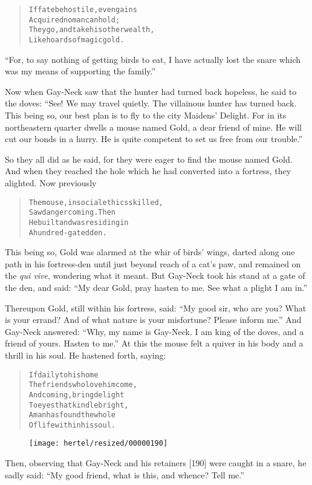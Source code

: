\documentclass[article, twoside, 10pt]{memoir}
\renewenvironment{verbatim}{%
\begin{quote}%
\vskip -10pt%
\begin{alltt}\normalfont\small}{\end{alltt}%
\end{quote}%
\vskip -10pt
} %
\begin{document}
\begin{verbatim}
If fate be hostile, even gains
Acquired no man can hold;
They go, and take his other wealth,
Like hoards of magic gold.
\end{verbatim}
``For, to say nothing of getting birds to eat, I have actually lost the snare which was my means of supporting the family.''

Now when Gay-Neck saw that the hunter had turned back hopeless, he
said to the doves:
``See! We may travel quietly. The villainous hunter has turned back. This being so, our best plan is to fly to the city Maidens' Delight. For in its northeastern quarter dwells a mouse named Gold, a dear friend of mine. He will cut our bonds in a hurry. He is quite competent to set us free from our trouble.''

So they all did as he said, for they were eager to find the mouse
named Gold. And when they reached the hole which he had converted
into a fortress, they alighted. Now previously

\begin{verbatim}
The mouse, in social ethics skilled,
    Saw danger coming. Then
He built and was residing in
    A hundred-gated den.
\end{verbatim}
This being so, Gold was alarmed at the whir of birds' wings, darted
along one path in his fortress-den until just beyond reach of a
cat's paw, and remained on the \emph{qui vive}, wondering what it
meant. But Gay-Neck took his stand at a gate of the den, and said:
``My dear Gold, pray hasten to me. See what a plight I am in.''

Thereupon Gold, still within his fortress, said:
``My good sir, who are you? What is your errand? And of what nature is your misfortune? Please inform me.''
And Gay-Neck answered:
``Why, my name is Gay-Neck. I am king of the doves, and a friend of yours. Hasten to me.''
At this the mouse felt a quiver in his body and a thrill in his
soul. He hastened forth, saying:

\begin{verbatim}
If daily to his home
The friends who love him come,
And coming, bring delight
To eyes that kindle bright,
A man has found the whole
Of life within his soul.
\end{verbatim}
\begin{figure}[p]\texttt{[image: hertel/resized/00000190]}\end{figure}Then, observing that Gay-Neck and his retainers [190] were caught
in a snare, he sadly said:
``My good friend, what is this, and whence? Tell me.''
\end{document}
